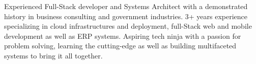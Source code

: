 

\begin{cvparagraph}

Experienced Full-Stack developer and Systems Architect with a demonstrated history in business consulting and government industries. 3+ years experience specializing in cloud infrastructures and deployment, full-Stack web and mobile development as well as ERP systems. Aspiring tech ninja with a passion for problem solving, learning the cutting-edge as well as building multifaceted systems to bring it all together.
\end{cvparagraph}
